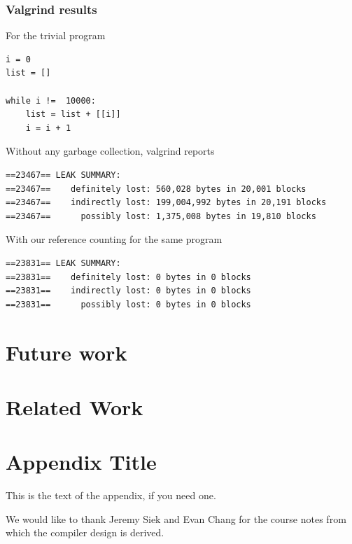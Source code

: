 \documentclass{sigplanconf}
\begin{document}
\subsubsection{Valgrind results}
For the trivial program
\begin{verbatim}
i = 0
list = []

while i !=  10000:
    list = list + [[i]]
    i = i + 1

\end{verbatim}
Without any garbage collection, valgrind reports 
\begin{verbatim}
==23467== LEAK SUMMARY:
==23467==    definitely lost: 560,028 bytes in 20,001 blocks
==23467==    indirectly lost: 199,004,992 bytes in 20,191 blocks
==23467==      possibly lost: 1,375,008 bytes in 19,810 blocks
\end{verbatim}
With our reference counting for the same program
\begin{verbatim}
==23831== LEAK SUMMARY:
==23831==    definitely lost: 0 bytes in 0 blocks
==23831==    indirectly lost: 0 bytes in 0 blocks
==23831==      possibly lost: 0 bytes in 0 blocks
\end{verbatim}
\section{Future work}
\section{Related Work}
\appendix
\section{Appendix Title}

This is the text of the appendix, if you need one.

\acks

We would like to thank Jeremy Siek and Evan Chang for the course notes from which the compiler design is derived.




\end{document}
